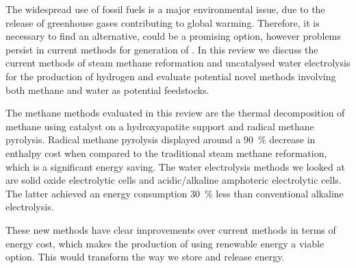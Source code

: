 The widespread use of fossil fuels is a major environmental issue, due to the release of greenhouse gases contributing to global warming.
Therefore, it is necessary to find an alternative,  could be a promising option, however problems persist in current methods for generation of .
In this review we discuss the current methods of steam methane reformation and uncatalysed water electrolysis for the production of hydrogen and evaluate potential novel methods involving both methane and water as potential feedstocks.

The methane methods evaluated in this review are the thermal decomposition of methane using  catalyst on a hydroxyapatite support and radical methane pyrolysis.
Radical methane pyrolysis displayed around a \SI{90}{\percent} decrease in enthalpy cost when compared to the traditional steam methane reformation, which is a significant energy saving.
The water electrolysis methods we looked at are solid oxide electrolytic cells and acidic/alkaline amphoteric electrolytic cells.
The latter achieved an energy consumption \SI{30}{\percent} less than conventional alkaline electrolysis.

These new methods have clear improvements over current methods in terms of energy cost, which makes the production of  using renewable energy a viable option.
This would transform the way we store and release energy.
